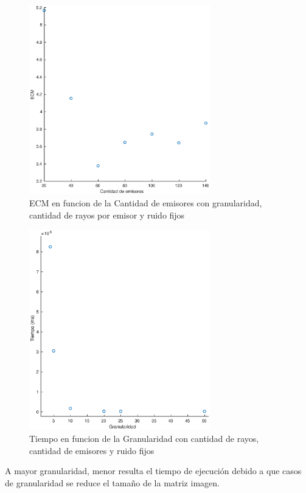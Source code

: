 \begin{figure}[H]
	\centering	\includegraphics[width=0.7\textwidth]{img/emi_ecm}
	\caption{ECM en funcion de la Cantidad de emisores con granularidad, cantidad de rayos por emisor y ruido fijos}
	\label{fig:emi_ecm}
\end{figure}


\begin{figure}[H]
	\centering	\includegraphics[width=0.7\textwidth]{img/granu_tiempo}
	\caption{Tiempo en funcion de la Granularidad con cantidad de rayos, cantidad de emisores y ruido fijos}
	\label{fig:granu_tiempo}
\end{figure}
\par A mayor granularidad, menor resulta el tiempo de ejecuci\'on debido a que casos de granularidad se reduce el tamaño de la matriz imagen.

